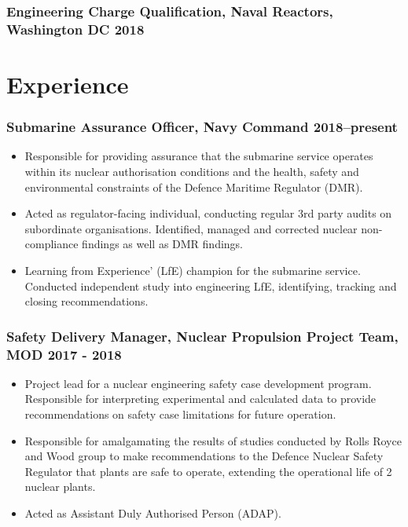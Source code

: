 \documentclass[a4paper, oneside, final, 11pt]{scrartcl} %
\begin{document}
\bigskip

\subsubsection*{Engineering Charge Qualification, Naval Reactors, Washington DC \hfill 2018}  


\medskip


\section{Experience}

\subsubsection*{Submarine Assurance Officer, Navy Command \hfill 2018--present}  
\normalfont
\begin{itemize}

\item Responsible for providing
assurance that the submarine service operates within its nuclear authorisation conditions and the health, safety and environmental constraints of the Defence Maritime Regulator (DMR).

\item Acted as regulator-facing individual, conducting regular 3rd party audits on subordinate organisations. Identified, managed and corrected nuclear non-compliance findings as well as DMR findings.

\item Learning from Experience’ (LfE) champion for the submarine service. Conducted independent study into engineering LfE, identifying, tracking and closing recommendations.

\end{itemize}

\smallskip 

\subsubsection*{Safety Delivery Manager,  Nuclear Propulsion Project Team, MOD \hfill 2017 - 2018}  
\normalfont
\begin{itemize}

\item Project lead for a nuclear engineering safety case development program.  Responsible for interpreting experimental and calculated data to provide recommendations on safety case limitations for future operation.

\item Responsible for amalgamating the results of studies conducted by Rolls Royce and Wood group to make recommendations to the Defence Nuclear Safety Regulator that plants are safe to operate, extending the operational life of 2 nuclear plants.

\item Acted as Assistant Duly Authorised Person (ADAP). 

\end{itemize}
\end{document}
